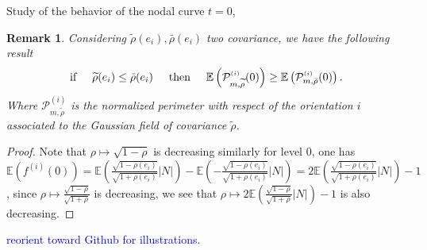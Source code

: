 \documentclass[12pt]{article}
\renewcommand{\tilde}{\widetilde}
\theoremstyle{Theorem}
\newtheorem{remark}{Remark}
\begin{document}
Study of the behavior of the nodal curve $t = 0$, 
\begin{remark}
Considering $\tilde{\rho}(e_i), \bar{\rho}(e_i)$ two covariance, we  have the following result 
\begin{equation*}
 \text{if} \hspace{0.5cm} \tilde{\rho}(e_i) \leq \bar{\rho}(e_i) \hspace{0.5cm} \text{then} \hspace{0.5cm}\mathbb{E}\left(\mathcal{P}^{\scriptscriptstyle (i)}_{m, \tilde{\rho}}(0)\right) \geq \mathbb{E}\left(\mathcal{P}^{\scriptscriptstyle (i)}_{m, \bar{\rho}}(0)\right).
\end{equation*}
Where $\mathcal{P}^{\scriptscriptstyle (i)}_{m, \tilde{\rho}}$ is the normalized perimeter with respect of the orientation $i$ associated to the Gaussian field of covariance $\tilde{\rho}$. 
\end{remark}
\begin{proof}
Note that $\rho \mapsto \sqrt{1-\rho}$ is decreasing similarly  for level $0$, one has $\mathbb{E}\left(f^{(i)}(0)\right) = \mathbb{E}\left(\frac{\sqrt{1-\rho(e_i)}}{\sqrt{1+\rho(e_i)}}|N|\right) - \mathbb{E}\left(-\frac{\sqrt{1-\rho(e_i)}}{\sqrt{1+\rho(e_i)}}|N|\right) = 2\mathbb{E}\left(\frac{\sqrt{1-\rho(e_i)}}{\sqrt{1+\rho(e_i)}}|N|\right) - 1$, since $\rho \mapsto \frac{\sqrt{1-\rho}}{\sqrt{1+\rho}}$ is decreasing, we see that $\rho \mapsto 2\mathbb{E}\left(\frac{\sqrt{1-\rho}}{\sqrt{1+\rho}}|N|\right) - 1 $ is also decreasing. 
\end{proof}
\textcolor{blue}{reorient toward Github for illustrations.}
\end{document}
